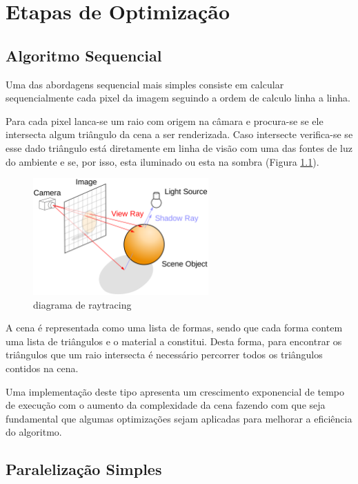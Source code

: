 \documentclass[a4paper]{report}
\begin{document}
\chapter{Etapas de Optimização}

\section{Algoritmo Sequencial}

Uma das abordagens sequencial mais simples consiste em calcular sequencialmente cada
pixel da imagem seguindo a ordem de calculo linha a linha.

Para cada pixel lanca-se um raio com origem na câmara e procura-se se ele
intersecta algum triângulo da cena a ser renderizada. Caso intersecte
verifica-se se esse dado triângulo está diretamente em linha de visão com uma
das fontes de luz do ambiente e se, por isso, esta iluminado ou esta na sombra
(Figura \ref{fig:raytrace}).

\begin{figure}[h]
    \centering
        \includegraphics[width=0.6\textwidth]{images/Ray_trace_diagram.png}
        \caption{diagrama de raytracing}
        \label{fig:raytrace}
\end{figure}

A cena é representada como uma lista de formas, sendo que cada forma contem
uma lista de triângulos e o material a constitui. Desta forma, para encontrar os
triângulos que um raio intersecta é necessário percorrer todos os triângulos
contidos na cena.

Uma implementação deste tipo apresenta um crescimento exponencial de tempo de
execução com o aumento da complexidade da cena fazendo com que seja fundamental
que algumas optimizações sejam aplicadas para melhorar a eficiência do
algoritmo.

\section{Paralelização Simples}
\end{document}

